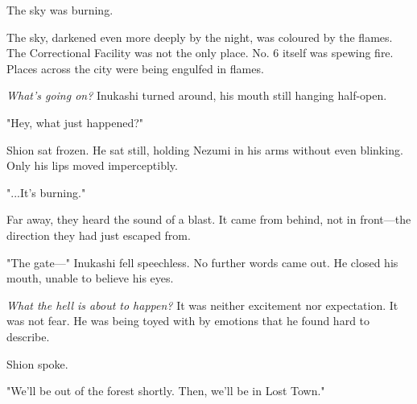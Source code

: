 The sky was burning.

The sky, darkened even more deeply by the night, was coloured by the
flames. The Correctional Facility was not the only place. No. 6 itself
was spewing fire. Places across the city were being engulfed in flames.

\emph{What's going on?} Inukashi turned around, his mouth still hanging
half-open.

"Hey, what just happened?"

Shion sat frozen. He sat still, holding Nezumi in his arms without even
blinking. Only his lips moved imperceptibly.

"...It's burning."

Far away, they heard the sound of a blast. It came from behind, not in
front---the direction they had just escaped from.

"The gate---" Inukashi fell speechless. No further words came out. He
closed his mouth, unable to believe his eyes.

\emph{What the hell is about to happen?} It was neither excitement nor
expectation. It was not fear. He was being toyed with by emotions that
he found hard to describe.

Shion spoke.

"We'll be out of the forest shortly. Then, we'll be in Lost Town."